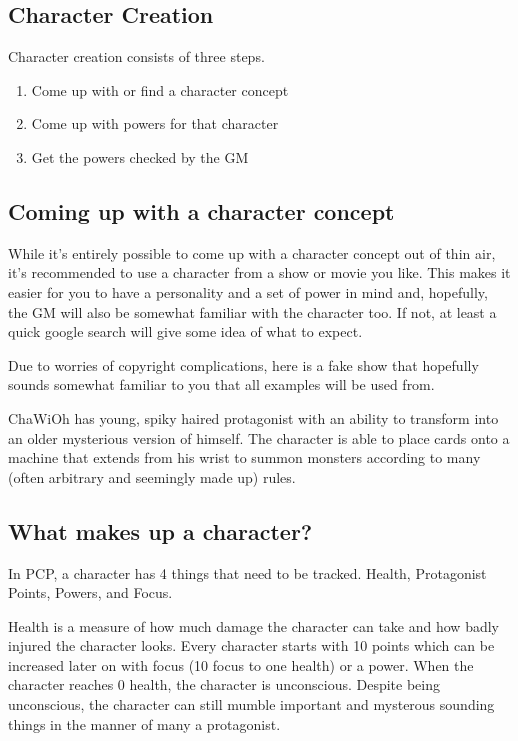 \begin{flushleft}

\chapter{Character Creation}

Character creation consists of three steps.

\begin{enumerate}

    \item{Come up with or find a character concept}
    \item{Come up with powers for that character}
    \item{Get the powers checked by the GM}

\end{enumerate}

\section*{Coming up with a character concept}

While it's entirely possible to come up with a character concept out of thin
air, it's recommended to use a character from a show or movie you like. This
makes it easier for you to have a personality and a set of power in mind and,
hopefully, the GM will also be somewhat familiar with the character too. If
not, at least a quick google search will give some idea of what to expect.

Due to worries of copyright complications, here is a fake show that hopefully
sounds somewhat familiar to you that all examples will be used from.

ChaWiOh has young, spiky haired protagonist with an ability to transform into
an older mysterious version of himself. The character is able to place cards
onto a machine that extends from his wrist to summon monsters according to many
(often arbitrary and seemingly made up) rules.

\section*{What makes up a character?}

In PCP, a character has 4 things that need to be tracked. Health, Protagonist
Points, Powers, and Focus.

Health is a measure of how much damage the character can take and how badly
injured the character looks. Every character starts with 10 points which can be
increased later on with focus (10 focus to one health) or a power. When the
character reaches 0 health, the character is unconscious. Despite being
unconscious, the character can still mumble important and mysterous sounding
things in the manner of many a protagonist.


\end{flushleft}
